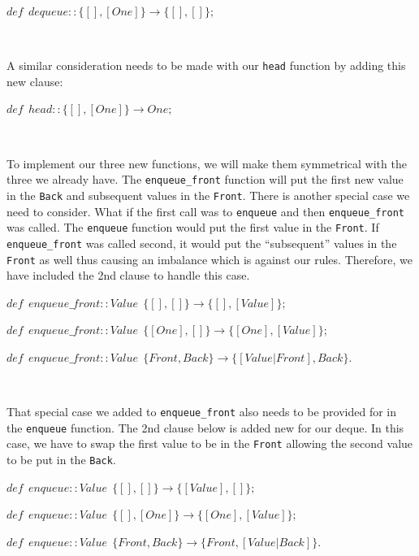 \documentclass[
]{book}
\begin{document}
\begin{formulabox}
\(de\mathit{f} ~ ~ dequeue :: \lbrace [], [One] \rbrace \rightarrow \lbrace [], [] \rbrace;\)

\end{formulabox}

\(\nonumber\)

A similar consideration needs to be made with our \texttt{head} function by adding this new clause:

\begin{formulabox}
\(de\mathit{f} ~ ~ head :: \lbrace [], [One] \rbrace \rightarrow One;\)

\end{formulabox}

\(\nonumber\)

To implement our three new functions, we will make them symmetrical with the three we already have. The \texttt{enqueue\_front} function will put the first new value in the \texttt{Back} and subsequent values in the \texttt{Front}. There is another special case we need to consider. What if the first call was to \texttt{enqueue} and then \texttt{enqueue\_front} was called. The \texttt{enqueue} function would put the first value in the \texttt{Front}. If \texttt{enqueue\_front} was called second, it would put the ``subsequent'' values in the \texttt{Front} as well thus causing an imbalance which is against our rules. Therefore, we have included the 2nd clause to handle this case.

\begin{formulabox}
\(de\mathit{f} ~ ~ enqueue\_front :: Value ~ ~ \lbrace [], [] \rbrace \rightarrow \lbrace [], [Value] \rbrace;\)

\(de\mathit{f} ~ ~ enqueue\_front :: Value ~ ~ \lbrace [One], [] \rbrace \rightarrow \lbrace [One], [Value] \rbrace;\)

\(de\mathit{f} ~ ~ enqueue\_front :: Value ~ ~ \lbrace Front, Back \rbrace \rightarrow \lbrace [Value|Front], Back \rbrace.\)

\end{formulabox}

\(\nonumber\)

That special case we added to \texttt{enqueue\_front} also needs to be provided for in the \texttt{enqueue} function. The 2nd clause below is added new for our deque. In this case, we have to swap the first value to be in the \texttt{Front} allowing the second value to be put in the \texttt{Back}.

\begin{formulabox}
\(de\mathit{f} ~ ~ enqueue :: Value ~ ~ \lbrace [], [] \rbrace \rightarrow \lbrace [Value], [] \rbrace;\)

\(de\mathit{f} ~ ~ enqueue :: Value ~ ~ \lbrace [], [One] \rbrace \rightarrow \lbrace [One], [Value] \rbrace;\)

\(de\mathit{f} ~ ~ enqueue :: Value ~ ~ \lbrace Front, Back \rbrace \rightarrow \lbrace Front, [Value|Back] \rbrace.\)

\end{formulabox}
\end{document}
